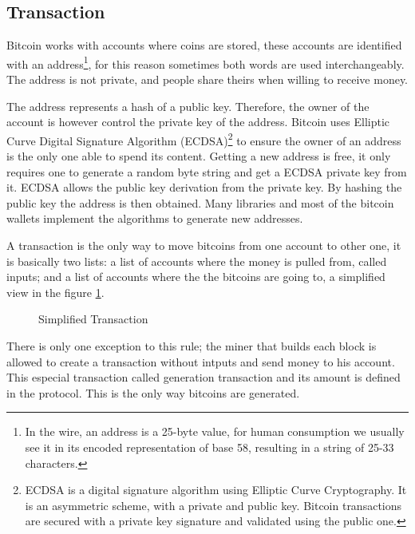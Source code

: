 \subsection{Transaction}\label{subsec:Transaction}
Bitcoin works with accounts where coins are stored, these accounts are
  identified with an address\footnote{In the wire, an address is a 25-byte
    value, for human consumption we usually see it in its encoded representation
    of base 58, resulting in a string of 25-33 characters.}, for this reason
  sometimes both words are used interchangeably.
The address is not private, and people share theirs when willing to receive
  money.

The address represents a hash of a public key. Therefore, the owner of the
  account is however control the private key of the address.
Bitcoin uses Elliptic Curve Digital Signature Algorithm (ECDSA)\footnote{
  ECDSA is a digital signature algorithm using Elliptic Curve
    Cryptography. It is an asymmetric scheme, with a private and public key.
    Bitcoin transactions are secured with a private key signature and validated
    using the public one.} to ensure the owner of an address is the only one able
  to spend its content.
Getting a new address is free, it only requires one to generate a random byte
  string and get a ECDSA private key from it. ECDSA allows the public key
  derivation from the private key.
By hashing the public key the address is then obtained.
Many libraries and most of the bitcoin wallets implement the algorithms to
  generate new addresses.

A transaction is the only way to move bitcoins from one account to other one,
  it is basically two lists:
  a list of accounts where the money is pulled from, called inputs; and a list
  of accounts where the the bitcoins are going to, a simplified
  view in the figure \ref{fig:simplified_transaction}.

\begin{figure}
	\centering
	
	\caption{Simplified Transaction}
	\label{fig:simplified_transaction}
\end{figure}

There is only one exception to this rule; the miner that builds each block is
  allowed to create a transaction without intputs and send money to his account.
This especial transaction called generation transaction and its amount is
  defined in the protocol.
This is the only way bitcoins are generated.

